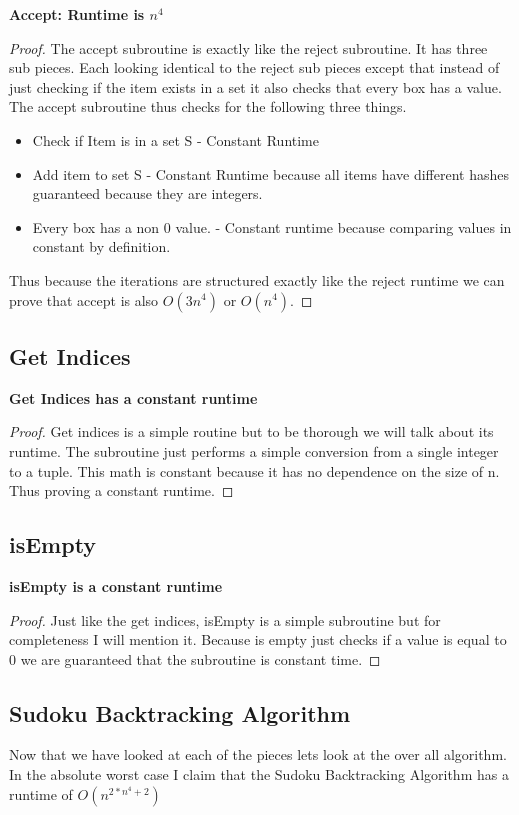 \documentclass{sig-alternate}
\begin{document}
\textbf{Accept: Runtime is $n^4$}
\begin{proof}
The accept subroutine is exactly like the reject subroutine. It has three sub pieces. Each looking identical to the reject sub pieces except that instead of just checking if the item exists in a set it also checks that every box has a value. The accept subroutine thus checks for the following three things. 

\begin{itemize}
\item{Check if Item is in a set S - Constant Runtime}
\item{Add item to set S - Constant Runtime because all items have different hashes guaranteed because they are integers.}
\item{Every box has a non 0 value. - Constant runtime because comparing values in constant by definition.}
\end{itemize}

Thus because the iterations are structured exactly like the reject runtime we can prove that accept is also $O(3n^4)$ or $O(n^4)$.
\end{proof}

\subsection{Get Indices}
\textbf{Get Indices has a constant runtime}
\begin{proof}
Get indices is a simple routine but to be thorough we will talk about its runtime. The subroutine just performs a simple conversion from a single integer to a tuple. This math is constant because it has no dependence on the size of n. Thus proving a constant runtime. 
\end{proof}

\subsection{isEmpty}
\textbf{isEmpty is a constant runtime}
\begin{proof}
Just like the get indices, isEmpty is a simple subroutine but for completeness I will mention it. Because is empty just checks if a value is equal to 0 we are guaranteed that the subroutine is constant time. 
\end{proof}

\subsection{Sudoku Backtracking Algorithm}
Now that we have looked at each of the pieces lets look at the over all algorithm. In the absolute worst case I claim that the Sudoku Backtracking Algorithm has a runtime of $O(n^{2*n^4 + 2})$
\end{document}
